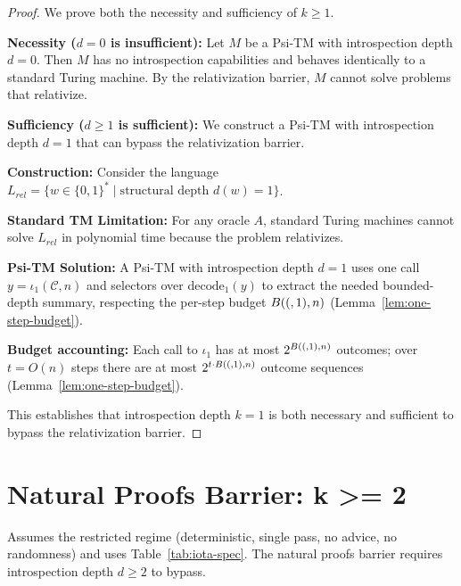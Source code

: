 \begin{proof}
We prove both the necessity and sufficiency of $k \geq 1$.

\textbf{Necessity ($d = 0$ is insufficient):}
Let $M$ be a Psi-TM with introspection depth $d = 0$. Then $M$ has no introspection capabilities and behaves identically to a standard Turing machine. By the relativization barrier, $M$ cannot solve problems that relativize.

\textbf{Sufficiency ($d \ge 1$ is sufficient):}
We construct a Psi-TM with introspection depth $d = 1$ that can bypass the relativization barrier.

\textbf{Construction:}
Consider the language $L_{rel} = \{w \in \{0,1\}^* \mid \text{structural depth } d(w) = 1\}$.

\textbf{Standard TM Limitation:}
For any oracle $A$, standard Turing machines cannot solve $L_{rel}$ in polynomial time because the problem relativizes.

\textbf{Psi-TM Solution:}
A Psi-TM with introspection depth $d = 1$ uses one call $y=\iota_1(\mathcal{C},n)$ and selectors over $\mathrm{decode}_1(y)$ to extract the needed bounded-depth summary, respecting the per-step budget $B((,1),n)$ (Lemma~\ref{lem:one-step-budget}).

\textbf{Budget accounting:}
Each call to $\iota_1$ has at most $2^{B((,1),n)}$ outcomes; over $t=O(n)$ steps there are at most $2^{t\cdot B((,1),n)}$ outcome sequences (Lemma~\ref{lem:one-step-budget}).

This establishes that introspection depth $k = 1$ is both necessary and sufficient to bypass the relativization barrier.
\end{proof}

\section{Natural Proofs Barrier: k >= 2}

\begin{theorem}
Assumes the restricted regime (deterministic, single pass, no advice, no randomness) and uses Table~\ref{tab:iota-spec}.
The natural proofs barrier requires introspection depth $d \geq 2$ to bypass.
\end{theorem}

